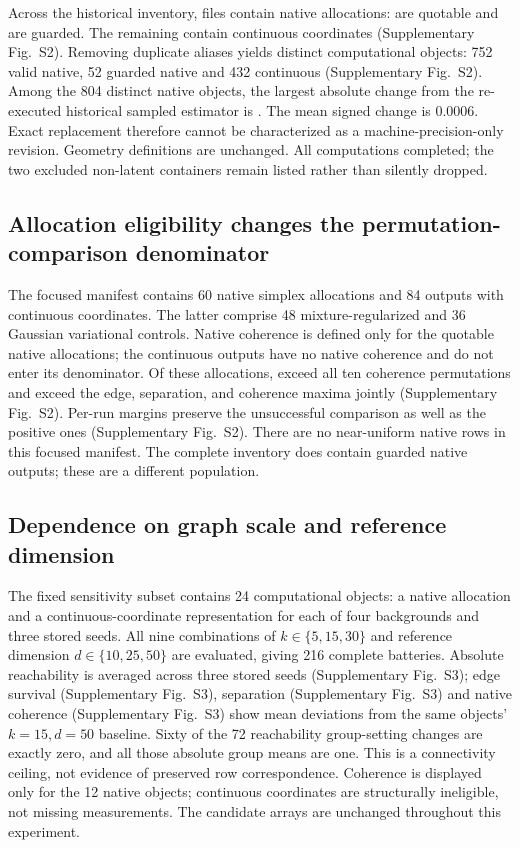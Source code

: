 \documentclass[11pt]{article}
\begin{document}
Across the historical inventory, \NativeFiles{} files contain native allocations: \ValidNativeFiles{} are quotable and \GuardedNativeFiles{} are guarded. The remaining \NonNativeFiles{} contain continuous coordinates (Supplementary Fig.~S2). Removing duplicate aliases yields \UniqueScores{} distinct computational objects: 752 valid native, 52 guarded native and 432 continuous (Supplementary Fig.~S2). Among the 804 distinct native objects, the largest absolute change from the re-executed historical sampled estimator is \MaxExactDelta{}. The mean signed change is 0.0006. Exact replacement therefore cannot be characterized as a machine-precision-only revision. Geometry definitions are unchanged. All \UniqueScores{} computations completed; the two excluded non-latent containers remain listed rather than silently dropped.

\subsection{Allocation eligibility changes the permutation-comparison denominator}

The focused manifest contains 60 native simplex allocations and 84 outputs with continuous coordinates. The latter comprise 48 mixture-regularized and 36 Gaussian variational controls. Native coherence is defined only for the \NullEligible{} quotable native allocations; the continuous outputs have no native coherence and do not enter its denominator. Of these allocations, \NullCoherence{} exceed all ten coherence permutations and \NullJoint{} exceed the edge, separation, and coherence maxima jointly (Supplementary Fig.~S2). Per-run margins preserve the unsuccessful comparison as well as the positive ones (Supplementary Fig.~S2). There are no near-uniform native rows in this focused manifest. The complete inventory does contain guarded native outputs; these are a different population.



\subsection{Dependence on graph scale and reference dimension}

The fixed sensitivity subset contains 24 computational objects: a native allocation and a continuous-coordinate representation for each of four backgrounds and three stored seeds. All nine combinations of $k\in\{5,15,30\}$ and reference dimension $d\in\{10,25,50\}$ are evaluated, giving 216 complete batteries. Absolute reachability is averaged across three stored seeds (Supplementary Fig.~S3); edge survival (Supplementary Fig.~S3), separation (Supplementary Fig.~S3) and native coherence (Supplementary Fig.~S3) show mean deviations from the same objects' $k=15,d=50$ baseline. Sixty of the 72 reachability group-setting changes are exactly zero, and all those absolute group means are one. This is a connectivity ceiling, not evidence of preserved row correspondence. Coherence is displayed only for the 12 native objects; continuous coordinates are structurally ineligible, not missing measurements. The candidate arrays are unchanged throughout this experiment.
\end{document}
